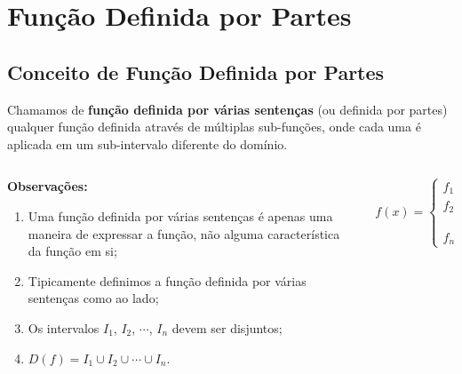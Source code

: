 \section{Função Definida por Partes}

\subsection{Conceito de Função Definida por Partes}
\begin{frame}
  \begin{definition}
    Chamamos de \textbf{função definida por várias sentenças} (ou definida por partes) qualquer função definida através de múltiplas sub-funções, onde cada uma é aplicada em um sub-intervalo diferente do domínio.
  \end{definition}
  \begin{columns}[onlytextwidth]
    \begin{column}{0.6\textwidth}
      \begin{highlight}
        \textbf{Observações:}
        \begin{enumerate}
          \item Uma função definida por várias sentenças é apenas uma maneira de expressar a função, não alguma característica da função em si;
          \item Tipicamente definimos a função definida por várias sentenças como ao lado;
          \item Os intervalos $I_{1}$, $I_{2}$, $\cdots$, $I_{n}$ devem ser disjuntos;
          \item $D(f) = I_{1}\cup I_{2}\cup\cdots\cup I_{n}$.
        \end{enumerate}
      \end{highlight}
    \end{column}
    \begin{column}{0.4\textwidth}\vspace*{0.5cm}
      \begin{center}
        \begin{equation*}
          f(x) = \begin{cases}
            f_{1}(x), &x\in I_{1},\\
            f_{2}(x), &x\in I_{2},\\
            &\vdots\\
            f_{n}(x), &x\in I_{n}
          \end{cases}
        \end{equation*}
      \end{center}
    \end{column}
  \end{columns}
\end{frame}

